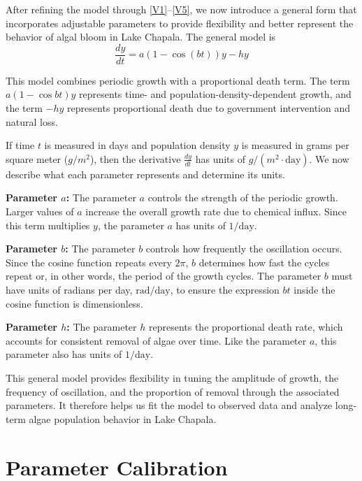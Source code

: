 \documentclass[11pt]{article}
\begin{document}
After refining the model through \ref{V1}--\ref{V5}, we now introduce a general form that incorporates adjustable parameters to provide flexibility and better represent the behavior of algal bloom in Lake Chapala. The general model is
\begin{equation}
    \frac{dy}{dt} = a(1 - \cos(bt))y - hy
    \label{2}
    \tag{2}
\end{equation}

This model combines periodic growth with a proportional death term. The term $a(1-\cos{bt})y$ represents time- and population-density-dependent growth, and the term $-hy$ represents proportional death due to government intervention and natural loss.

If time $t$ is measured in days and population density $y$ is measured in grams per square meter ($g/m^2$), then the derivative $\frac{dy}{dt}$ has units of $g/(m^2\cdot \text{day})$. We now describe what each parameter represents and determine its units.

\textbf{Parameter $a$:} The parameter $a$ controls the strength of the periodic growth. Larger values of $a$ increase the overall growth rate due to chemical influx. Since this term multiplies $y$, the parameter $a$ has units of $1/\text{day}$.

\textbf{Parameter $b$:} The parameter $b$ controls how frequently the oscillation occurs. Since the cosine function repeats every $2\pi$, $b$ determines how fast the cycles repeat or, in other words, the period of the growth cycles. The parameter $b$ must have units of radians per day, $\mathrm{rad}/\text{day}$, to ensure the expression $bt$ inside the cosine function is dimensionless.

\textbf{Parameter $h$:} The parameter $h$ represents the proportional death rate, which accounts for consistent removal of algae over time. Like the parameter $a$, this parameter also has units of $1/\text{day}$.

This general model provides flexibility in tuning the amplitude of growth, the frequency of oscillation, and the proportion of removal through the associated parameters. It therefore helps us fit the model to observed data and analyze long-term algae population behavior in Lake Chapala.

\section{Parameter Calibration}
\label{sec:calibration}
\end{document}
